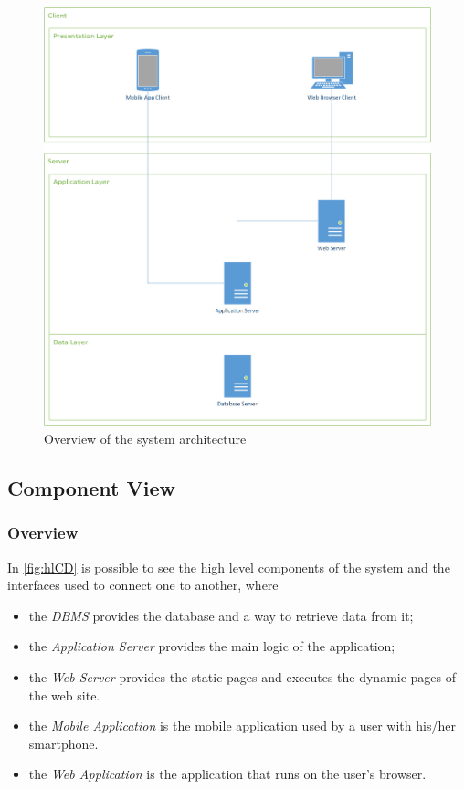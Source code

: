 \begin{figure}
	\includegraphics[width=\textwidth, height=\textheight, keepaspectratio=true]{Img/Overview}
	\caption{Overview of the system architecture}
	\label{fig:overview}
\end{figure}

\clearpage


\subsection{Component View}

\subsubsection{Overview}

In \autoref{fig:hlCD} is possible to see the high level components of the system and the interfaces used to connect one to another, where
\begin{itemize}
	\item the \emph{DBMS} provides the database and a way to retrieve data from it;
	\item the \emph{Application Server} provides the main logic of the application;
	\item the \emph{Web Server} provides the static pages and executes the dynamic pages of the web site.
	\item the \emph{Mobile Application} is the mobile application used by a user with his/her smartphone.
	\item the \emph{Web Application} is the application that runs on the user's browser.
\end{itemize}

